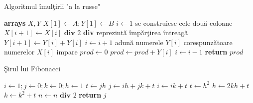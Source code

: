 \documentclass{article}
\begin{document}
\begin{algorithm}
\caption{Algoritmul îmulţirii "a la russe"}\label{russe}
\begin{algorithmic}[1]
	\State \textbf{arrays} $X, Y$
	\State {}
	\State $X[1] \gets A; Y[1] \gets B$
	\State $i \gets 1$ \Comment se construiesc cele două coloane
		\State $X[i+1] \gets X[i] \textbf{ div } 2$ \Comment \textbf{div} reprezintă împărţirea întreagă
		\State $Y[i+1] \gets Y[i] + Y[i]$
		\State $i \gets i+1$
	\EndWhile
	\State \Comment adună numerele $Y[i]$ corespunzătoare numerelor $X[i]$ impare
	\State $prod \gets 0$
			\State $prod \gets prod + Y[i]$
			\State $i \gets i - 1$
		\EndIf
	\EndWhile
	\State \textbf{return } $prod$
\EndProcedure
\end{algorithmic}
\end{algorithm}

\begin{algorithm}
\caption{Şirul lui Fibonacci}\label{fibonacci}
\begin{algorithmic}[1]
	\State $i \gets 1; j \gets 0; k \gets 0; h \gets 1$
			\State $t \gets jh$
			\State $j \gets ih + jk + t$
			\State $i \gets ik + t$
		\EndIf
		\State $t \gets h^2$
		\State $h \gets 2kh+t$
		\State $k \gets k^2+t$
		\State $n \gets n \textbf{ div } 2$
	\EndWhile
	\State \textbf{return } $j$
\EndProcedure
\end{algorithmic}
\end{algorithm}
\end{document}
